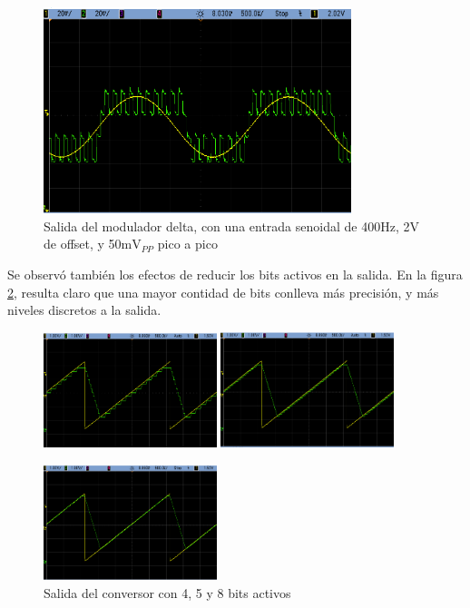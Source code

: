 \documentclass[assd_tp3_main.tex]{subfiles}
\begin{document}
\begin{figure}[htb!]
	\centering
	\includegraphics[width = 0.8\textwidth]
	{images/ej3/d__.png}
	\caption{Salida del modulador delta, con una entrada senoidal de 400Hz, 2V de offset, y 50m$\mathrm{V}_{PP}$ pico a pico}
	\label{fig:md-chiquita}
\end{figure}


Se observ\'o tambi\'en los efectos de reducir los bits activos en la salida. En la figura \ref{fig:md-bits}, resulta claro que una mayor contidad de bits conlleva m\'as precisi\'on, y m\'as niveles discretos a la salida.

\begin{figure}[htb!]
	\centering
	\includegraphics[width = 0.45\textwidth]
	{images/ej3/d_4.png}
	\includegraphics[width = 0.45\textwidth]
	{images/ej3/d_5.png}
	
	\includegraphics[width = 0.45\textwidth]
	{images/ej3/d_8.png}
	\caption{Salida del conversor con 4, 5 y 8 bits activos}
	\label{fig:md-bits}
\end{figure}
\end{document}

